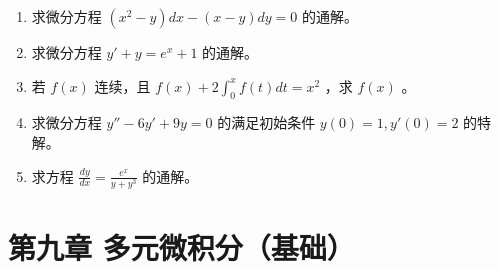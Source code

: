 \documentclass[12pt, a4paper]{article}
\begin{document}
\begin{enumerate}
    \item 求微分方程 $ (x^{2}-y)dx-(x-y)dy=0 $ 的通解。

    \item 求微分方程 $ y' + y = e^{x} + 1 $ 的通解。

    \item 若 $ f(x) $ 连续，且 $ f(x) + 2 \int_{0}^{x} f(t) dt = x^{2} $ ，求 $ f(x) $ 。

    \item 求微分方程 $ y'' - 6y' + 9y = 0 $ 的满足初始条件 $ y(0) = 1, y'(0) = 2 $ 的特解。

    \item 求方程 $ \frac{dy}{dx}=\frac{e^{x}}{y+y^{3}} $ 的通解。
\end{enumerate}

\section*{第九章 多元微积分（基础）}
\end{document}
